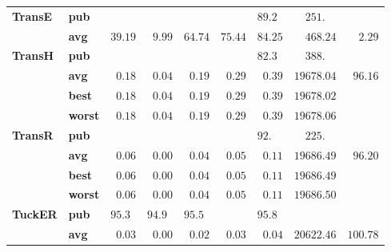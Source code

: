 \begin{tabular}{llrrrrrrr}
\textbf{TransE} & \textbf{pub} &                    &                    &                    &                    &  $89.2\phantom{0}$ &  $\phantom{00}251.\phantom{00}$ &                     \\
       & \textbf{avg} &            $39.19$ &  $\phantom{0}9.99$ &            $64.74$ &            $75.44$ &            $84.25$ &            $\phantom{00}468.24$ &  $\phantom{00}2.29$ \\
\textbf{TransH} & \textbf{pub} &                    &                    &                    &                    &  $82.3\phantom{0}$ &  $\phantom{00}388.\phantom{00}$ &                     \\
       & \textbf{avg} &  $\phantom{0}0.18$ &  $\phantom{0}0.04$ &  $\phantom{0}0.19$ &  $\phantom{0}0.29$ &  $\phantom{0}0.39$ &                      $19678.04$ &  $\phantom{0}96.16$ \\
       & \textbf{best} &  $\phantom{0}0.18$ &  $\phantom{0}0.04$ &  $\phantom{0}0.19$ &  $\phantom{0}0.29$ &  $\phantom{0}0.39$ &                      $19678.02$ &                     \\
       & \textbf{worst} &  $\phantom{0}0.18$ &  $\phantom{0}0.04$ &  $\phantom{0}0.19$ &  $\phantom{0}0.29$ &  $\phantom{0}0.39$ &                      $19678.06$ &                     \\
\textbf{TransR} & \textbf{pub} &                    &                    &                    &                    &  $92.\phantom{00}$ &  $\phantom{00}225.\phantom{00}$ &                     \\
       & \textbf{avg} &  $\phantom{0}0.06$ &  $\phantom{0}0.00$ &  $\phantom{0}0.04$ &  $\phantom{0}0.05$ &  $\phantom{0}0.11$ &                      $19686.49$ &  $\phantom{0}96.20$ \\
       & \textbf{best} &  $\phantom{0}0.06$ &  $\phantom{0}0.00$ &  $\phantom{0}0.04$ &  $\phantom{0}0.05$ &  $\phantom{0}0.11$ &                      $19686.49$ &                     \\
       & \textbf{worst} &  $\phantom{0}0.06$ &  $\phantom{0}0.00$ &  $\phantom{0}0.04$ &  $\phantom{0}0.05$ &  $\phantom{0}0.11$ &                      $19686.50$ &                     \\
\textbf{TuckER} & \textbf{pub} &  $95.3\phantom{0}$ &  $94.9\phantom{0}$ &  $95.5\phantom{0}$ &                    &  $95.8\phantom{0}$ &                                 &                     \\
       & \textbf{avg} &  $\phantom{0}0.03$ &  $\phantom{0}0.00$ &  $\phantom{0}0.02$ &  $\phantom{0}0.03$ &  $\phantom{0}0.04$ &                      $20622.46$ &            $100.78$ \\
\bottomrule
\end{tabular}


